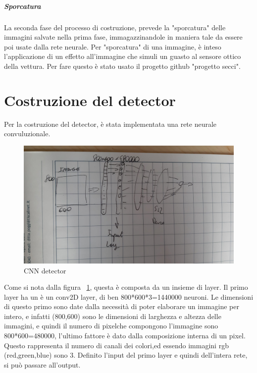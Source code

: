 \documentclass[14pt]{extarticle}
\begin{document}
\begin{itemize}

\subparagraph{Sporcatura}
La seconda fase del processo di costruzione, prevede la "sporcatura" delle immagini salvate nella prima fase, immagazzinandole in maniera tale da essere poi usate dalla rete neurale.
Per "sporcatura" di una immagine, è inteso l'applicazione di un effetto all'immagine che simuli un guasto al sensore ottico della vettura.
Per fare questo è stato usato il progetto github "progetto secci".

\section{Costruzione del detector}
Per la  costruzione del detector,  è stata implementata una rete neurale convuluzionale. 
\begin{figure}[h!]
  \includegraphics[scale=0.1]{"cnnmodel"}
  \caption{CNN detector}
  \label{fig:CNN}
\end{figure}

Come si nota dalla figura ~\ref{fig:CNN}, questa è composta da un insieme di layer.
Il primo layer ha un è un conv2D layer, di ben 800*600*3=1440000 neuroni.
Le dimensioni di questo primo sono date dalla necessità di poter elaborare un immagine per intero, e infatti (800,600) sono le dimensioni di larghezza e altezza delle immagini, e quindi il numero di pixelche compongono l'immagine sono 800*600=480000,  l'ultimo fattore è dato dalla composizione interna di un pixel. Questo rappresenta il numero di canali dei colori,ed essendo immagini rgb (red,green,blue) sono 3.
Definito l'input del primo layer e quindi dell'intera rete, si può passare all'output.
   

\end{itemize}
\end{document}
